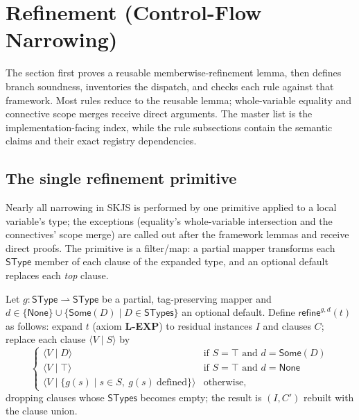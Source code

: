 \documentclass[11pt]{article}
\newcommand{\refineop}{\mathsf{refine}}
\newcommand{\SType}{\mathsf{SType}}
\newcommand{\STypes}{\mathsf{STypes}}
\newcommand{\clause}[2]{\langle #1 \mid #2 \rangle}
\begin{document}
\section{Refinement (Control-Flow Narrowing)}
\label{sec:refinement}

The section first proves a reusable memberwise-refinement lemma, then defines
branch soundness, inventories the dispatch, and checks each rule against that
framework. Most rules reduce to the reusable lemma; whole-variable equality
and connective scope merges receive direct arguments. The master list is the
implementation-facing index, while the rule subsections contain the semantic
claims and their exact registry dependencies.

\subsection{The single refinement primitive}

Nearly all narrowing in SKJS is performed by one primitive applied to a
local variable's type; the exceptions (equality's whole-variable
intersection and the connectives' scope merge) are called out after the
framework lemmas and receive direct proofs. The primitive is a filter/map:
a partial mapper transforms each $\SType$ member of each clause of the
expanded type, and an optional default replaces each \emph{top} clause.

\begin{definition}
\label{def:branchwise}
Let $g : \SType \rightharpoonup \SType$ be a partial, tag-preserving mapper
and $d \in \{\mathsf{None}\} \cup \{\mathsf{Some}(D) \mid D \in \STypes\}$ an
optional default. Define $\refineop^{g,d}(t)$ as follows: expand $t$
(axiom \textbf{L-EXP}) to residual instances $I$ and clauses $C$; replace each
clause $\clause{V}{S}$ by
\[
\begin{cases}
\clause{V}{D} & \text{if } S = \top \text{ and } d = \mathsf{Some}(D)\\
\clause{V}{\top} & \text{if } S = \top \text{ and } d = \mathsf{None}\\
\clause{V}{\{g(s) \mid s \in S,\ g(s)\ \mathrm{defined}\}} & \text{otherwise},
\end{cases}
\]
dropping clauses whose $\STypes$ becomes empty; the result is
$(I, C')$ rebuilt with the clause union.
\end{definition}
\end{document}
